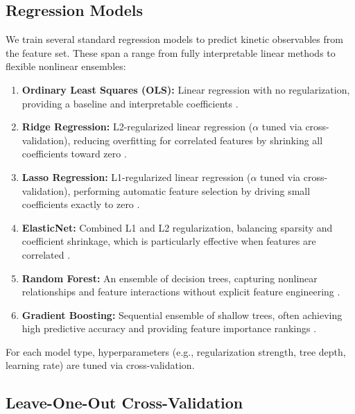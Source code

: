\subsection{Regression Models}\label{subsec:models}

We train several standard regression models to predict kinetic observables from the
feature set. These span a range from fully interpretable linear methods to flexible
nonlinear ensembles:

\begin{enumerate}
  \item \textbf{Ordinary Least Squares (OLS):} Linear regression with no
        regularization, providing a baseline and interpretable coefficients
        \cite{HastieTibshirani2009ESL}.

  \item \textbf{Ridge Regression:} L2-regularized linear regression ($\alpha$ tuned via
        cross-validation), reducing overfitting for correlated features by shrinking all
        coefficients toward zero \cite{HoerlKennard1970Ridge}.

  \item \textbf{Lasso Regression:} L1-regularized linear regression ($\alpha$ tuned via
        cross-validation), performing automatic feature selection by driving small
        coefficients exactly to zero \cite{Tibshirani1996Lasso}.

  \item \textbf{ElasticNet:} Combined L1 and L2 regularization, balancing sparsity and
        coefficient shrinkage, which is particularly effective when features are
        correlated \cite{ZouHastie2005ElasticNet}.

  \item \textbf{Random Forest:} An ensemble of decision trees, capturing nonlinear
        relationships and feature interactions without explicit feature engineering
        \cite{Breiman2001RandomForests}.

  \item \textbf{Gradient Boosting:} Sequential ensemble of shallow trees, often
        achieving high predictive accuracy and providing feature importance rankings
        \cite{Friedman2001GBM}.
\end{enumerate}

For each model type, hyperparameters (e.g., regularization strength, tree depth,
learning rate) are tuned via cross-validation.


\subsection{Leave-One-Out Cross-Validation}\label{subsec:loocv}

